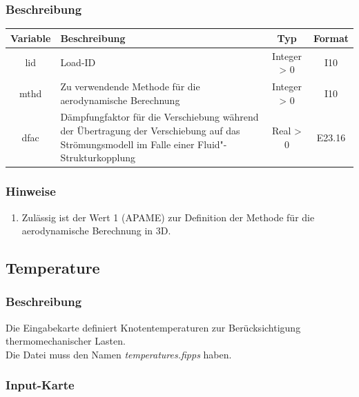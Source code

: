 \documentclass[11pt,titlepage,listof=totoc,bibliography=totoc,twoside]{scrreprt}
\begin{document}
{{\subsubsection{Beschreibung}

\begin{tabularx}{\textwidth}{cXcc}
\toprule
Variable  & Beschreibung  & Typ          & Format  \\
\midrule
lid       & Load-ID       & Integer > 0  & I10     \\
mthd      & Zu verwendende Methode für die aerodynamische Berechnung & Integer > 0 & I10  \\
dfac      & Dämpfungfaktor für die Verschiebung während der Übertragung der Verschiebung auf das Strömungsmodell im Falle einer Fluid"-Strukturkopplung & Real > 0 & E23.16  \\
\bottomrule
\end{tabularx}

\subsubsection{Hinweise}

\begin{enumerate}
\item Zulässig ist der Wert 1 (APAME) zur Definition der Methode für die aerodynamische Berechnung in 3D.
\end{enumerate}

\newpage

\subsection{Temperature}

\subsubsection{Beschreibung}

Die Eingabekarte definiert Knotentemperaturen zur Berücksichtigung thermomechanischer Lasten.\\
Die Datei muss den Namen \emph{temperatures.fipps} haben.

\subsubsection{Input-Karte}

}}
\end{document}
